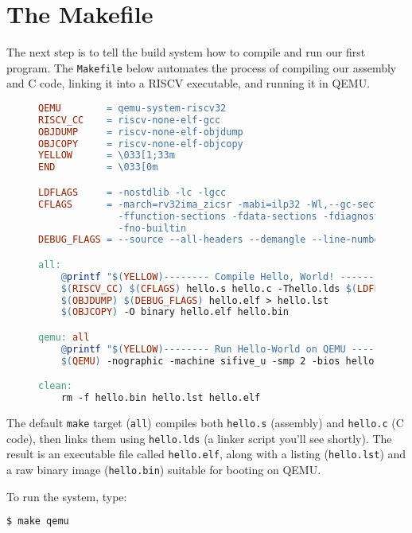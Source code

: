 \section{The Makefile}

The next step is to tell the build system how to compile and run our first
program.  The \texttt{Makefile} below automates the process of compiling our
assembly and C code, linking it into a RISC\textendash V executable, and running
it in QEMU.

\begin{figure}[H]
\centering
\begin{minipage}{0.95\textwidth}
\begin{lstlisting}[style=oscode,language=make,caption={Makefile for building and running the ``Hello World'' kernel},label={lst:makefile}]
QEMU        = qemu-system-riscv32
RISCV_CC    = riscv-none-elf-gcc
OBJDUMP     = riscv-none-elf-objdump
OBJCOPY     = riscv-none-elf-objcopy
YELLOW      = \033[1;33m
END         = \033[0m

LDFLAGS     = -nostdlib -lc -lgcc
CFLAGS      = -march=rv32ima_zicsr -mabi=ilp32 -Wl,--gc-sections \
              -ffunction-sections -fdata-sections -fdiagnostics-show-option \
              -fno-builtin
DEBUG_FLAGS = --source --all-headers --demangle --line-numbers --wide

all:
	@printf "$(YELLOW)-------- Compile Hello, World! --------$(END)\n"
	$(RISCV_CC) $(CFLAGS) hello.s hello.c -Thello.lds $(LDFLAGS) -o hello.elf
	$(OBJDUMP) $(DEBUG_FLAGS) hello.elf > hello.lst
	$(OBJCOPY) -O binary hello.elf hello.bin

qemu: all
	@printf "$(YELLOW)-------- Run Hello-World on QEMU --------$(END)\n"
	$(QEMU) -nographic -machine sifive_u -smp 2 -bios hello.bin

clean:
	rm -f hello.bin hello.lst hello.elf
\end{lstlisting}
\end{minipage}
\end{figure}

The default \texttt{make} target (\texttt{all}) compiles both
\texttt{hello.s} (assembly) and \texttt{hello.c} (C code), then links them
using \texttt{hello.lds} (a linker script you’ll see shortly).  The result is an
executable file called \texttt{hello.elf}, along with a listing
(\texttt{hello.lst}) and a raw binary image (\texttt{hello.bin}) suitable for
booting on QEMU.

To run the system, type:

\begin{lstlisting}[style=oscode,language=bash]
$ make qemu
\end{lstlisting}

